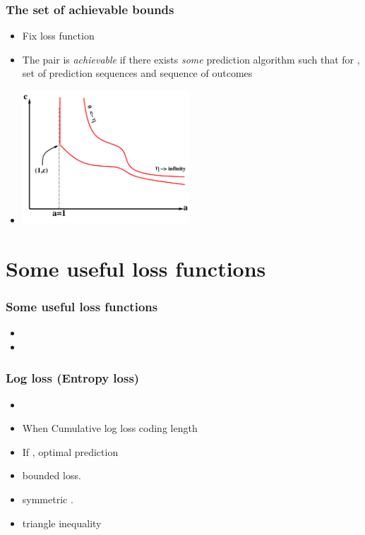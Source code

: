 \documentclass{beamer}
\begin{document}
\begin{frame}
\frametitle{The set of achievable bounds}
\begin{itemize}
\item 
Fix loss function \R{$\lambda: \Omega \times \Gamma \to [0,\infty)$}
\item
The pair  is {\em achievable} if there exists 
{\em some} prediction algorithm
such that for  ,  set of  prediction
sequences and  sequence of outcomes
\item
\begin{center}
\includegraphics[height=5cm]{figures/achievable2.pdf}
\end{center}
\end{itemize}
\end{frame}

\section{Some useful loss functions}

\begin{frame}
\frametitle{Some useful loss functions}
\begin{itemize}
\item
{}   
\item
{} 
\end{itemize}
\end{frame}

\begin{frame}
\frametitle{Log loss (Entropy loss)} 
\begin{itemize}
\item
\R{\[ \lambda_{\text{ent}}(\omega,\gamma) = \omega \ln \frac{\omega}{\gamma} 
                              +(1-\omega) \ln \frac{1-\omega}{1-\gamma} \]}
\item
When  Cumulative log loss \R{$=$} coding length 
\item
If , optimal prediction 
\item
{}bounded loss.
\item
{} symmetric .
\item
{} triangle inequality
\end{itemize}
\end{frame}
\end{document}
